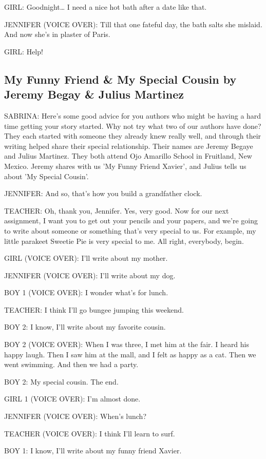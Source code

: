 GIRL:
Goodnight\dots
I need a nice hot bath after a date like that.

JENNIFER (VOICE OVER):
Till that one fateful day, the bath salts she mislaid.
And now she's in plaster of Paris.

GIRL:
Help!

\subsection{My Funny Friend \& My Special Cousin by Jeremy Begay \& Julius Martinez}

SABRINA:
Here's some good advice for you authors who might be having a hard time getting your story started.
Why not try what two of our authors have done?
They each started with someone they already knew really well, and through their writing helped share their special relationship.
Their names are Jeremy Begaye and Julius Martinez.
They both attend Ojo Amarillo School in Fruitland, New Mexico.
Jeremy shares with us 'My Funny Friend Xavier', and Julius tells us about 'My Special Cousin'.

JENNIFER:
And so, that's how you build a grandfather clock.

TEACHER:
Oh, thank you, Jennifer.
Yes, very good.
Now for our next assignment, I want you to get out your pencils and your papers, and we're going to write about someone or something that's very special to us.
For example, my little parakeet Sweetie Pie is very special to me.
All right, everybody, begin.

GIRL (VOICE OVER):
I'll write about my mother.

JENNIFER (VOICE OVER):
I'll write about my dog.

BOY 1 (VOICE OVER):
I wonder what's for lunch.

TEACHER:
I think I'll go bungee jumping this weekend.

BOY 2:
I know, I'll write about my favorite cousin.

BOY 2 (VOICE OVER):
When I was three, I met him at the fair.
I heard his happy laugh.
Then I saw him at the mall, and I felt as happy as a cat.
Then we went swimming.
And then we had a party.

BOY 2:
My special cousin.
The end.

GIRL 1 (VOICE OVER):
I'm almost done.

JENNIFER (VOICE OVER):
When's lunch?

TEACHER (VOICE OVER):
I think I'll learn to surf.

BOY 1:
I know, I'll write about my funny friend Xavier.

